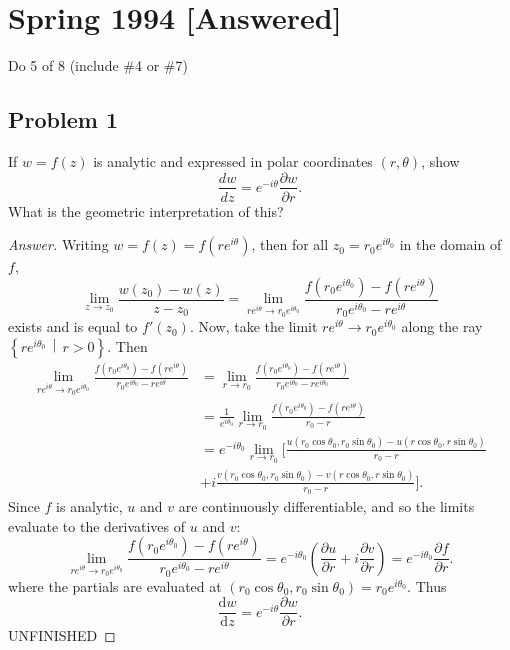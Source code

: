 \documentclass[12pt]{article}
\newcommand\paren[1]{\left( #1 \right)}
\newcommand\setb[1]{\left \{ #1 \right \}}
\theoremstyle{definition}
\begin{document}
\section{Spring 1994 [Answered]}
Do 5 of 8 (include \#4 or \#7)
\subsection{Problem 1}
If $w = f(z)$ is analytic and expressed in polar coordinates $(r,\theta)$, show 
\[
    \frac{dw}{dz} = e^{-i\theta} \frac{\partial w}{\partial r}.
\]
What is the geometric interpretation of this?
\begin{proof}[Answer]
    Writing $w = f(z) = f \paren{ re^{i\theta} }$, then for all $z_0 = r_0 e^{i \theta_0}$ in the domain of $f$, 
    \[
        \lim\limits_{z \to z_0} \frac{w(z_0) - w(z)}{z - z_0} = \lim\limits_{re^{i\theta} \to r_0 e^{i \theta_0}} \frac{f \paren{ r_0 e^{i \theta_0} } - f \paren{ re^{i\theta} }}{ r_0 e^{i\theta_0} - re^{i\theta} }
    \]
    exists and is equal to $f'\paren{z_0}$. Now, take the limit $re^{i\theta} \to r_0 e^{i\theta_0}$ along the ray $\setb{ r e^{i\theta_0} \, \middle| \, r >0 }$. Then 
    \begin{align*}
        \lim\limits_{re^{i\theta} \to r_0 e^{i \theta_0}} \frac{f \paren{ r_0 e^{i \theta_0} } - f \paren{ re^{i\theta} }}{ r_0 e^{i\theta_0} - re^{i\theta} } & = \lim\limits_{r \to r_0} \frac{f \paren{ r_0 e^{i \theta_0} } - f \paren{ re^{i\theta} }}{ r_0 e^{i\theta_0} - re^{i\theta_0} } \\
        & = \frac{1}{e^{i\theta_0}} \lim\limits_{r \to r_0} \frac{f \paren{ r_0 e^{i \theta_0} } - f \paren{ re^{i\theta} }}{r_0 - r} \\
        & = e^{-i\theta_0} \lim\limits_{r \to r_0} \Bigg[ \frac{ u \paren{ r_0\cos\theta_0,r_0\sin\theta_0} - u \paren{ r\cos\theta_0,r\sin\theta_0} }{r_0 - r} \\
        & + i\frac{ v \paren{ r_0\cos\theta_0,r_0\sin\theta_0} - v \paren{ r\cos\theta_0,r\sin\theta_0} }{r_0 - r} \Bigg].
    \end{align*}
    Since $f$ is analytic, $u$ and $v$ are continuously differentiable, and so the limits evaluate to the derivatives of $u$ and $v$:
    \[
        \lim\limits_{re^{i\theta} \to r_0 e^{i \theta_0}} \frac{f \paren{ r_0 e^{i \theta_0} } - f \paren{ re^{i\theta} }}{ r_0 e^{i\theta_0} - re^{i\theta} } = e^{-i\theta_0} \paren{ \frac{\partial u}{\partial r} + i \frac{\partial v}{\partial r} } = e^{-i\theta_0} \frac{\partial f}{\partial r}.
    \]
    where the partials are evaluated at $\paren{ r_0 \cos \theta_0 , r_0 \sin \theta_0 } = r_0 e^{i\theta_0}$. Thus 
    \[
        \frac{\mathrm{d}w}{\mathrm{d}z} = e^{-i\theta} \frac{\partial w}{\partial r}.
    \]
    UNFINISHED
\end{proof}
\end{document}
